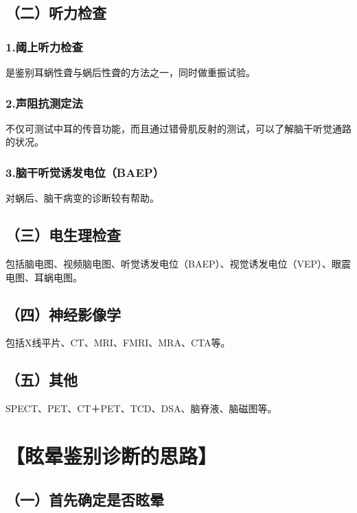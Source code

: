\subsection{（二）听力检查}

\subsubsection{1.阈上听力检查}

是鉴别耳蜗性聋与蜗后性聋的方法之一，同时做重振试验。

\subsubsection{2.声阻抗测定法}

不仅可测试中耳的传音功能，而且通过错骨肌反射的测试，可以了解脑干听觉通路的状况。

\subsubsection{3.脑干听觉诱发电位（BAEP）}

对蜗后、脑干病变的诊断较有帮助。

\subsection{（三）电生理检查}

包括脑电图、视频脑电图、听觉诱发电位（BAEP）、视觉诱发电位（VEP）、眼震电图、耳蜗电图。

\subsection{（四）神经影像学}

包括X线平片、CT、MRI、FMRI、MRA、CTA等。

\subsection{（五）其他}

SPECT、PET、CT＋PET、TCD、DSA、脑脊液、脑磁图等。

\section{【眩晕鉴别诊断的思路】}

\subsection{（一）首先确定是否眩晕}

